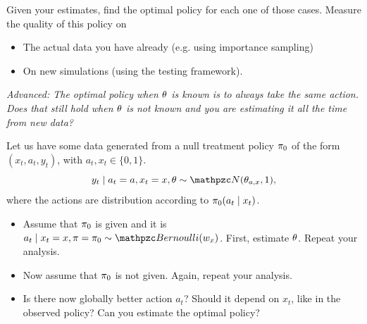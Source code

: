 \begin{frame}
{    \begin{exercise}
      Given your estimates, find the optimal policy for each one of those cases. Measure the quality of this policy on
      \begin{itemize}
      \item The actual data you have already (e.g. using importance sampling)
      \item On new simulations (using the testing framework).
      \end{itemize}
      \emph{Advanced: The optimal policy when $\theta$ is known is to always take the same action. Does that still hold when $\theta$ is not known and you are estimating it all the time from new data?}
    \end{exercise}


    \begin{exercise}[Advanced]
      Let us have some data generated from a null treatment policy $\pi_0$ of the form $(x_t, a_t, y_t)$, with $a_t, x_t \in \{0, 1\}$.
      \[
      y_t \mid a_t = a, x_t = x, \param \sim \Normal(\param_{a,x}, 1),
      \]
      where the actions are distribution according to $\pi_0(a_t \mid x_t)$. 
      \begin{itemize}
      \item Assume that $\pi_0$ is given and it is $a_t \mid x_t = x, \pol = \pol_0 \sim \Bernoulli(w_{x})$. First, estimate $\theta$. Repeat your analysis.
      \item Now assume that $\pi_0$ is not given.  Again, repeat your analysis.
      \item Is there now globally better action $a_t$? Should it depend on $x_t$, like in the observed policy? Can you estimate the optimal policy?
      \end{itemize}
    \end{exercise}
  }
\end{frame}
